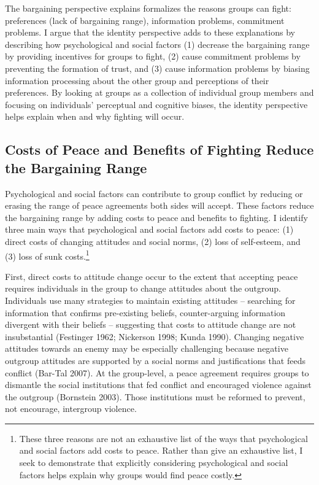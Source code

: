 \documentclass[11pt]{article}
\begin{document}
The bargaining perspective explains formalizes the reasons groups can
fight: preferences (lack of bargaining range), information problems,
commitment problems. I argue that the identity perspective adds to these
explanations by describing how psychological and social factors (1)
decrease the bargaining range by providing incentives for groups to
fight, (2) cause commitment problems by preventing the formation of
trust, and (3) cause information problems by biasing information
processing about the other group and perceptions of their preferences.
By looking at groups as a collection of individual group members and
focusing on individuals' perceptual and cognitive biases, the identity
perspective helps explain when and why fighting will occur.

\hypertarget{costs-of-peace-and-benefits-of-fighting-reduce-the-bargaining-range}{%
\subsection{Costs of Peace and Benefits of Fighting Reduce the
Bargaining
Range}\label{costs-of-peace-and-benefits-of-fighting-reduce-the-bargaining-range}}

Psychological and social factors can contribute to group conflict by
reducing or erasing the range of peace agreements both sides will
accept. These factors reduce the bargaining range by adding costs to
peace and benefits to fighting. I identify three main ways that
psychological and social factors add costs to peace: (1) direct costs of
changing attitudes and social norms, (2) loss of self-esteem, and (3)
loss of sunk costs.\footnote{These three reasons are not an exhaustive
  list of the ways that psychological and social factors add costs to
  peace. Rather than give an exhaustive list, I seek to demonstrate that
  explicitly considering psychological and social factors helps explain
  why groups would find peace costly.}

First, direct costs to attitude change occur to the extent that
accepting peace requires individuals in the group to change attitudes
about the outgroup. Individuals use many strategies to maintain existing
attitudes -- searching for information that confirms pre-existing
beliefs, counter-arguing information divergent with their beliefs --
suggesting that costs to attitude change are not insubstantial
(Festinger 1962; Nickerson 1998; Kunda 1990). Changing negative
attitudes towards an enemy may be especially challenging because
negative outgroup attitudes are supported by a social norms and
justifications that feeds conflict (Bar-Tal 2007). At the group-level, a
peace agreement requires groups to dismantle the social institutions
that fed conflict and encouraged violence against the outgroup
(Bornstein 2003). Those institutions must be reformed to prevent, not
encourage, intergroup violence.
\end{document}
